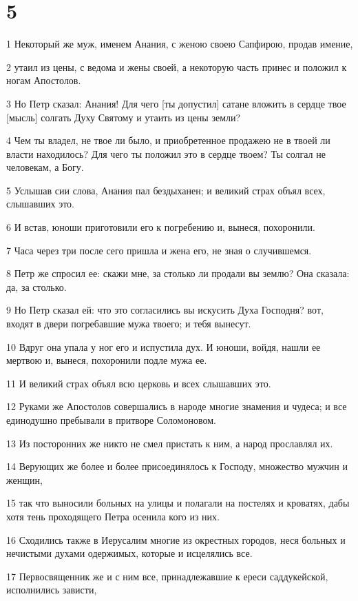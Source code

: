 \chapter{5}

\par 1 Некоторый же муж, именем Анания, с женою своею Сапфирою, продав имение,
\par 2 утаил из цены, с ведома и жены своей, а некоторую часть принес и положил к ногам Апостолов.
\par 3 Но Петр сказал: Анания! Для чего [ты допустил] сатане вложить в сердце твое [мысль] солгать Духу Святому и утаить из цены земли?
\par 4 Чем ты владел, не твое ли было, и приобретенное продажею не в твоей ли власти находилось? Для чего ты положил это в сердце твоем? Ты солгал не человекам, а Богу.
\par 5 Услышав сии слова, Анания пал бездыханен; и великий страх объял всех, слышавших это.
\par 6 И встав, юноши приготовили его к погребению и, вынеся, похоронили.
\par 7 Часа через три после сего пришла и жена его, не зная о случившемся.
\par 8 Петр же спросил ее: скажи мне, за столько ли продали вы землю? Она сказала: да, за столько.
\par 9 Но Петр сказал ей: что это согласились вы искусить Духа Господня? вот, входят в двери погребавшие мужа твоего; и тебя вынесут.
\par 10 Вдруг она упала у ног его и испустила дух. И юноши, войдя, нашли ее мертвою и, вынеся, похоронили подле мужа ее.
\par 11 И великий страх объял всю церковь и всех слышавших это.
\par 12 Руками же Апостолов совершались в народе многие знамения и чудеса; и все единодушно пребывали в притворе Соломоновом.
\par 13 Из посторонних же никто не смел пристать к ним, а народ прославлял их.
\par 14 Верующих же более и более присоединялось к Господу, множество мужчин и женщин,
\par 15 так что выносили больных на улицы и полагали на постелях и кроватях, дабы хотя тень проходящего Петра осенила кого из них.
\par 16 Сходились также в Иерусалим многие из окрестных городов, неся больных и нечистыми духами одержимых, которые и исцелялись все.
\par 17 Первосвященник же и с ним все, принадлежавшие к ереси саддукейской, исполнились зависти,
